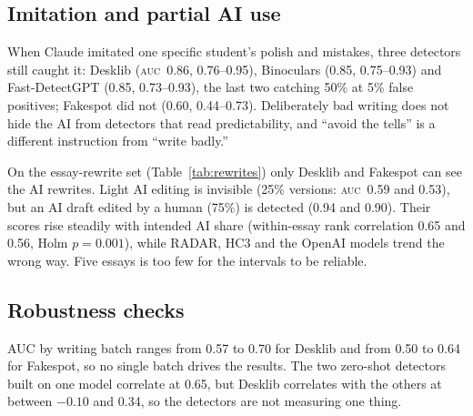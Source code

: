 \documentclass[conference]{IEEEtran}
\newcommand{\auc}{\textsc{auc}}
\begin{document}
\begin{table}[t]
\caption{Human-written essays. Quality: Spearman correlation between holistic score and detector score, within prompt ($n=180$). Learners: probability that a learner essay outscores a matched non-learner essay ($n=50$ each). Matched gap: learner minus non-learner percentile-rank difference within the same quality score, in points. $p_{\text{Holm}}$ is for the matched gap.}
\label{tab:humanside}
\centering
\footnotesize

\end{table}

\subsection{Imitation and partial AI use}
\label{sec:partial}
When Claude imitated one specific student's polish and mistakes, three detectors still caught it: Desklib (\auc\ 0.86, 0.76--0.95), Binoculars (0.85, 0.75--0.93) and Fast-DetectGPT (0.85, 0.73--0.93), the last two catching 50\% at 5\% false positives; Fakespot did not (0.60, 0.44--0.73). Deliberately bad writing does not hide the AI from detectors that read predictability, and ``avoid the tells'' is a different instruction from ``write badly.''

On the essay-rewrite set (Table~\ref{tab:rewrites}) only Desklib and Fakespot can see the AI rewrites. Light AI editing is invisible (25\% versions: \auc\ 0.59 and 0.53), but an AI draft edited by a human (75\%) is detected (0.94 and 0.90). Their scores rise steadily with intended AI share (within-essay rank correlation 0.65 and 0.56, Holm $p=0.001$), while RADAR, HC3 and the OpenAI models trend the wrong way. Five essays is too few for the intervals to be reliable.

\begin{table}[t]
\caption{Essay-rewrite set: \auc\ of each AI version against the human originals, and the within-essay rank correlation between intended AI share and score.}
\label{tab:rewrites}
\centering
\footnotesize
\setlength{\tabcolsep}{3pt}

\end{table}

\subsection{Robustness checks}
AUC by writing batch ranges from 0.57 to 0.70 for Desklib and from 0.50 to 0.64 for Fakespot, so no single batch drives the results. The two zero-shot detectors built on one model correlate at 0.65, but Desklib correlates with the others at between $-0.10$ and 0.34, so the detectors are not measuring one thing.
\end{document}
